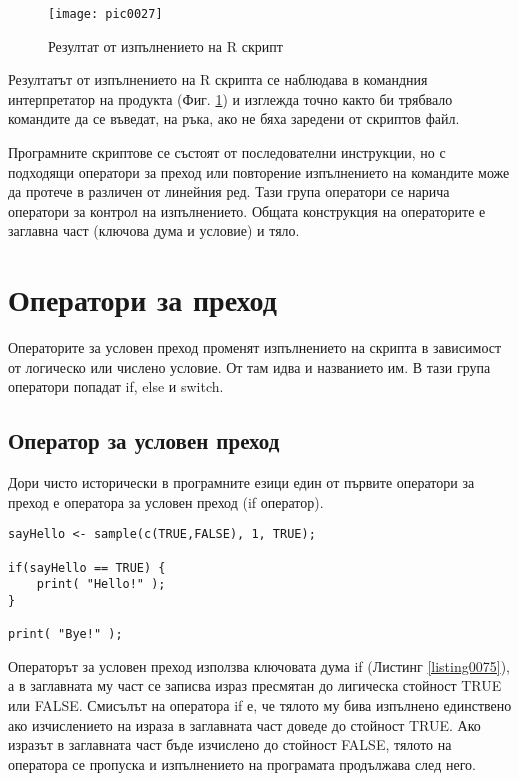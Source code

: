 \begin{figure}[h!]
  \centering
  \texttt{[image: pic0027]}
  \caption{Резултат от изпълнението на R скрипт}
\label{figure0027}
\end{figure}
\FloatBarrier

Резултатът от изпълнението на R скрипта се наблюдава в командния интерпретатор на продукта (Фиг. \ref{figure0027}) и изглежда точно както би трябвало командите да се въведат, на ръка, ако не бяха заредени от скриптов файл.

Програмните скриптове се състоят от последователни инструкции, но с подходящи оператори за преход или повторение изпълнението на командите може да протече в различен от линейния ред. Тази група оператори се нарича оператори за контрол на изпълнението. Общата конструкция на операторите е заглавна част (ключова дума и условие) и тяло. 

\section{Оператори за преход}

Операторите за условен преход променят изпълнението на скрипта в зависимост от логическо или числено условие. От там идва и названието им. В тази група оператори попадат if, else и switch.

\subsection{Оператор за условен преход}

Дори чисто исторически в програмните езици един от първите оператори за преход е оператора за условен преход (if оператор). 

\begin{lstlisting}[caption=Оператор за условен преход if, label=listing0075]
sayHello <- sample(c(TRUE,FALSE), 1, TRUE);

if(sayHello == TRUE) {
	print( "Hello!" );
}

print( "Bye!" );
\end{lstlisting}

Операторът за условен преход използва ключовата дума if (Листинг \ref{listing0075}), а в заглавната му част се записва израз пресмятан до лигическа стойност TRUE или FALSE. Смисълът на оператора if е, че тялото му бива изпълнено единствено ако изчислението на израза в заглавната част доведе до стойност TRUE. Ако изразът в заглавната част бъде изчислено до стойност FALSE, тялото на оператора се пропуска и изпълнението на програмата продължава след него.

